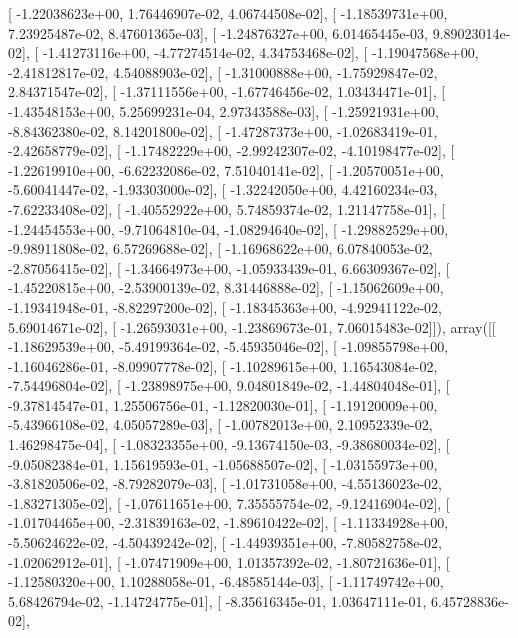 \documentclass{article}
\begin{document}
       [ -1.22038623e+00,   1.76446907e-02,   4.06744508e-02],
       [ -1.18539731e+00,   7.23925487e-02,   8.47601365e-03],
       [ -1.24876327e+00,   6.01465445e-03,   9.89023014e-02],
       [ -1.41273116e+00,  -4.77274514e-02,   4.34753468e-02],
       [ -1.19047568e+00,  -2.41812817e-02,   4.54088903e-02],
       [ -1.31000888e+00,  -1.75929847e-02,   2.84371547e-02],
       [ -1.37111556e+00,  -1.67746456e-02,   1.03434471e-01],
       [ -1.43548153e+00,   5.25699231e-04,   2.97343588e-03],
       [ -1.25921931e+00,  -8.84362380e-02,   8.14201800e-02],
       [ -1.47287373e+00,  -1.02683419e-01,  -2.42658779e-02],
       [ -1.17482229e+00,  -2.99242307e-02,  -4.10198477e-02],
       [ -1.22619910e+00,  -6.62232086e-02,   7.51040141e-02],
       [ -1.20570051e+00,  -5.60041447e-02,  -1.93303000e-02],
       [ -1.32242050e+00,   4.42160234e-03,  -7.62233408e-02],
       [ -1.40552922e+00,   5.74859374e-02,   1.21147758e-01],
       [ -1.24454553e+00,  -9.71064810e-04,  -1.08294640e-02],
       [ -1.29882529e+00,  -9.98911808e-02,   6.57269688e-02],
       [ -1.16968622e+00,   6.07840053e-02,  -2.87056415e-02],
       [ -1.34664973e+00,  -1.05933439e-01,   6.66309367e-02],
       [ -1.45220815e+00,  -2.53900139e-02,   8.31446888e-02],
       [ -1.15062609e+00,  -1.19341948e-01,  -8.82297200e-02],
       [ -1.18345363e+00,  -4.92941122e-02,   5.69014671e-02],
       [ -1.26593031e+00,  -1.23869673e-01,   7.06015483e-02]]), array([[ -1.18629539e+00,  -5.49199364e-02,  -5.45935046e-02],
       [ -1.09855798e+00,  -1.16046286e-01,  -8.09907778e-02],
       [ -1.10289615e+00,   1.16543084e-02,  -7.54496804e-02],
       [ -1.23898975e+00,   9.04801849e-02,  -1.44804048e-01],
       [ -9.37814547e-01,   1.25506756e-01,  -1.12820030e-01],
       [ -1.19120009e+00,  -5.43966108e-02,   4.05057289e-03],
       [ -1.00782013e+00,   2.10952339e-02,   1.46298475e-04],
       [ -1.08323355e+00,  -9.13674150e-03,  -9.38680034e-02],
       [ -9.05082384e-01,   1.15619593e-01,  -1.05688507e-02],
       [ -1.03155973e+00,  -3.81820506e-02,  -8.79282079e-03],
       [ -1.01731058e+00,  -4.55136023e-02,  -1.83271305e-02],
       [ -1.07611651e+00,   7.35555754e-02,  -9.12416904e-02],
       [ -1.01704465e+00,  -2.31839163e-02,  -1.89610422e-02],
       [ -1.11334928e+00,  -5.50624622e-02,  -4.50439242e-02],
       [ -1.44939351e+00,  -7.80582758e-02,  -1.02062912e-01],
       [ -1.07471909e+00,   1.01357392e-02,  -1.80721636e-01],
       [ -1.12580320e+00,   1.10288058e-01,  -6.48585144e-03],
       [ -1.11749742e+00,   5.68426794e-02,  -1.14724775e-01],
       [ -8.35616345e-01,   1.03647111e-01,   6.45728836e-02],
\end{document}
